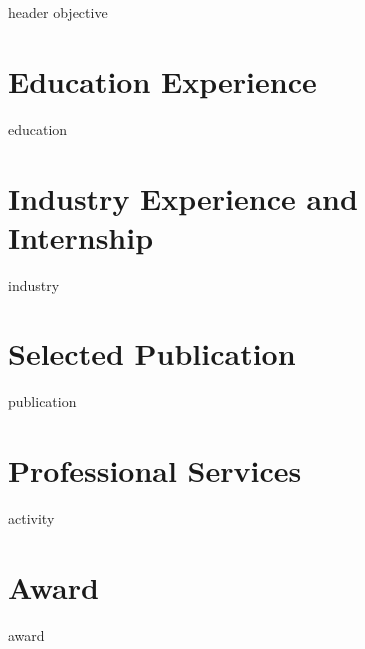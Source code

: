 \documentclass[letter,10pt]{article}
\begin{document}
{header}
{objective}

\section{Education Experience}
{education}

\section{Industry Experience and Internship}
{industry}


\section{Selected Publication}
{publication}



\section{Professional Services}
{activity}

\section{Award}
{award}
\end{document}
